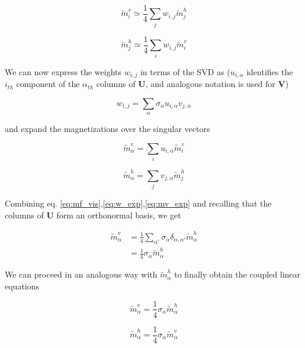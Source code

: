 \documentclass[notitlepage]{revtex4-1}
\begin{document}
\begin{equation}
\tilde{m}_i^v \simeq \frac{1}{4} \sum_j w_{i,j} \tilde{m}_j^h
\label{eq:mf_vis}
\end{equation}

\begin{equation}
\tilde{m}_j^h \simeq \frac{1}{4} \sum_i w_{i,j} \tilde{m}_i^v
\end{equation}

We can now express the weights \(w_{i,j}\) in terms of the SVD as (\(u_{i,\alpha}\) identifies the \(i_{th}\) component of the \(\alpha_{th}\) columns of \(\mathbf{U}\), and analogous notation is used for \(\mathbf{V}\))

\begin{equation}
w_{i,j} = \sum_{\alpha} \sigma_{\alpha} u_{i,\alpha} v_{j,\alpha}
\label{eq:w_exp}
\end{equation}

and expand the magnetizations over the singular vectors

\begin{equation}
\tilde{m}_{\alpha}^v = \sum_i u_{i,\alpha} \tilde{m}_i^v
\label{eq:mv_exp}
\end{equation}

\begin{equation}
\tilde{m}_{\alpha}^h = \sum_j v_{j,\alpha} \tilde{m}_j^h
\end{equation}

Combining eq. \eqref{eq:mf_vis},\eqref{eq:w_exp},\eqref{eq:mv_exp} and recalling that the columns of \(\mathbf{U}\) form an orthonormal basis, we get

\begin{align*}
\tilde{m}_{\alpha}^v & = \frac{1}{4} \sum_{\alpha '} \sigma_{\alpha} \delta_{\alpha,\alpha '} \tilde{m}_{\alpha}^h \\ \nonumber
& = \frac{1}{4} \sigma_{\alpha} \tilde{m}_{\alpha}^h \nonumber
\end{align*}

We can proceed in an analogous way with \(\tilde{m}_{\alpha}^h\) to finally obtain the coupled linear equations

\begin{equation}
\tilde{m}_{\alpha}^v = \frac{1}{4} \sigma_{\alpha} \tilde{m}_{\alpha}^h
\label{eq:svd_like_vis}
\end{equation}

\begin{equation}
\tilde{m}_{\alpha}^h = \frac{1}{4} \sigma_{\alpha} \tilde{m}_{\alpha}^v
\label{eq:svd_like_hid}
\end{equation}
\end{document}
